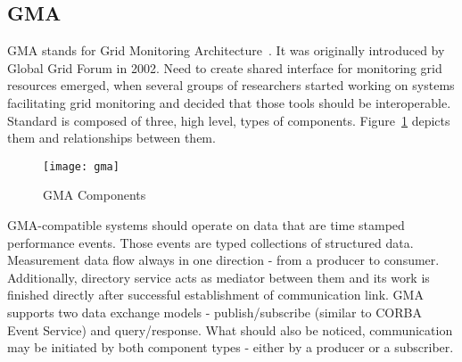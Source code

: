 \subsection{GMA}

\label{ssec:gma}

GMA stands for Grid Monitoring Architecture~\cite{GMA1,GMA2}. It was originally introduced by Global Grid Forum in 2002. Need to create shared interface for monitoring grid resources emerged, when several groups of researchers started working on systems facilitating grid monitoring and decided that those tools should be interoperable. Standard is composed of three, high level, types of components. Figure~\ref{fig:gma} depicts them and relationships between them.

\begin{figure}[ht]

\centering

\texttt{[image: gma]} \caption{GMA Components} \label{fig:gma}

\end{figure}

GMA-compatible systems should operate on data that are time stamped performance events. Those events are typed collections of structured data. Measurement data flow always in one direction - from a producer to consumer. Additionally, directory service acts as mediator between them and its work is finished directly after successful establishment of communication link. GMA supports two data exchange models - publish/subscribe (similar to CORBA Event Service) and query/response. What should also be noticed, communication may be initiated by both component types - either by a producer or a subscriber.